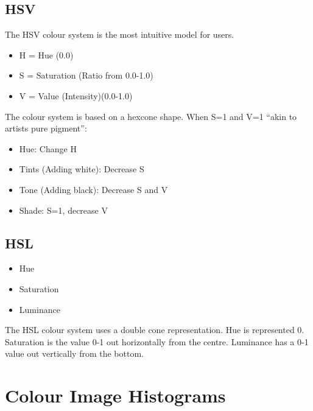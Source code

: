 \documentclass{article}
\begin{document}
\subsection{HSV}
The HSV colour system is the most intuitive model for users.
\begin{itemize}
	\item H = Hue (0.0\degree)
	\item S = Saturation (Ratio from 0.0-1.0)
	\item V = Value (Intensity)(0.0-1.0)
\end{itemize}
The colour system is based on a hexcone shape.
When S=1 and V=1 ``akin to artists pure pigment'':
\begin{itemize}
	\item Hue: Change H
	\item Tints (Adding white): Decrease S
	\item Tone (Adding black): Decrease S and V
	\item Shade: S=1, decrease V
\end{itemize}

\subsection{HSL}
\begin{itemize}
	\item Hue
	\item Saturation
	\item Luminance
\end{itemize}
The HSL colour system uses a double cone representation.
Hue is represented 0\degree.
Saturation is the value 0-1 out horizontally from the centre.
Luminance has a 0-1 value out vertically from the bottom.

\section{Colour Image Histograms}
\end{document}
